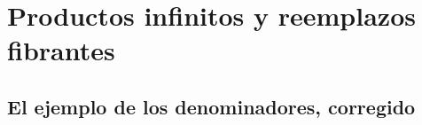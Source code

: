 \section{Productos infinitos y reemplazos fibrantes}

\subsection{El ejemplo de los denominadores, corregido}

